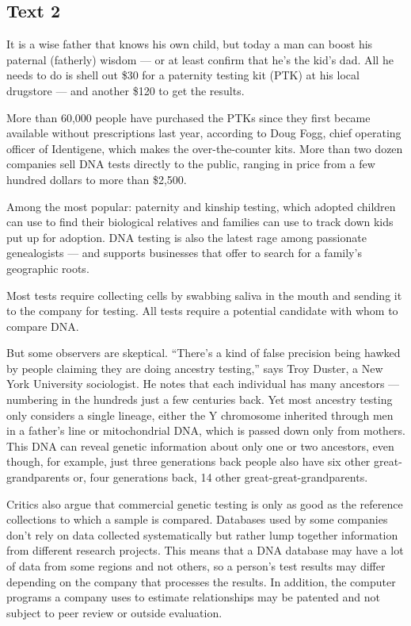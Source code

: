 \documentclass[UTF8,11pt]{ctexart}
\begin{document}
\subsection*{\textbf{Text 2}}


It is a wise father that knows his own child, but today a man can boost his paternal (fatherly) wisdom — or at least confirm that he’s the kid’s dad. All he needs to do is shell out \$30 for a paternity testing kit (PTK) at his local drugstore — and another \$120 to get the results.


More than 60,000 people have purchased the PTKs since they first became available without prescriptions last year, according to Doug Fogg, chief operating officer of Identigene, which makes the over-the-counter kits. More than two dozen companies sell DNA tests directly to the public, ranging in price from a few hundred dollars to more than \$2,500.


Among the most popular: paternity and kinship testing, which adopted children can use to find their biological relatives and families can use to track down kids put up for adoption. DNA testing is also the latest rage among passionate genealogists — and supports businesses that offer to search for a family’s geographic roots.


Most tests require collecting cells by swabbing saliva in the mouth and sending it to the company for testing. All tests require a potential candidate with whom to compare DNA.


But some observers are skeptical. “There’s a kind of false precision being hawked by people claiming they are doing ancestry testing,” says Troy Duster, a New York University sociologist. He notes that each individual has many ancestors — numbering in the hundreds just a few centuries back. Yet most ancestry testing only considers a single lineage, either the Y chromosome inherited through men in a father’s line or mitochondrial DNA, which is passed down only from mothers. This DNA can reveal genetic information about only one or two ancestors, even though, for example, just three generations back people also have six other great-grandparents or, four generations back, 14 other great-great-grandparents.


Critics also argue that commercial genetic testing is only as good as the reference collections to which a sample is compared. Databases used by some companies don’t rely on data collected systematically but rather lump together information from different research projects. This means that a DNA database may have a lot of data from some regions and not others, so a person’s test results may differ depending on the company that processes the results. In addition, the computer programs a company uses to estimate relationships may be patented and not subject to peer review or outside evaluation.
\end{document}
